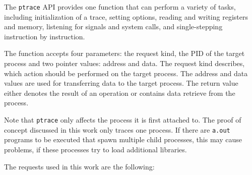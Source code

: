 \documentclass[draft,final]{vutinfth} %
\begin{document}
The \texttt{ptrace} API provides one function that can perform a variety of tasks, including initialization of a trace, setting options, reading and writing registers and memory, listening for signals and system calls, and single-stepping instruction by instruction.

The function accepts four parameters: the request kind, the PID of the target process and two pointer values: address and data. The request kind describes, which action should be performed on the target process. The address and data values are used for transferring data to the target process. The return value either denotes the result of an operation or contains data retrieve from the process.

Note that \texttt{ptrace} only affects the process it is first attached to. The proof of concept discussed in this work only traces one process. If there are \texttt{a.out} programs to be executed that spawn multiple child processes, this may cause problems, if these processes try to load additional libraries.

The requests used in this work are the following:
\end{document}
